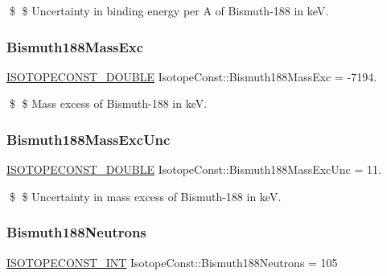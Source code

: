 \$ \$ Uncertainty in binding energy per A of Bismuth-\/188 in keV. \mbox{\label{group___isotope_const-_bismuth-_bi188_ga1f9b59eec0aa8df4194155f8e20e243f}} 
\subsubsection{\texorpdfstring{Bismuth188\+Mass\+Exc}{Bismuth188MassExc}}
{\footnotesize\ttfamily \mbox{\hyperlink{group___isotope_const-_macros_ga8f45a7272ce02c0b4c65c44636ed719a}{I\+S\+O\+T\+O\+P\+E\+C\+O\+N\+S\+T\+\_\+\+D\+O\+U\+B\+LE}} Isotope\+Const\+::\+Bismuth188\+Mass\+Exc = -\/7194.}

\$ \$ Mass excess of Bismuth-\/188 in keV. \mbox{\label{group___isotope_const-_bismuth-_bi188_ga9abcb3d229080be5d2673c29e9899f69}} 
\subsubsection{\texorpdfstring{Bismuth188\+Mass\+Exc\+Unc}{Bismuth188MassExcUnc}}
{\footnotesize\ttfamily \mbox{\hyperlink{group___isotope_const-_macros_ga8f45a7272ce02c0b4c65c44636ed719a}{I\+S\+O\+T\+O\+P\+E\+C\+O\+N\+S\+T\+\_\+\+D\+O\+U\+B\+LE}} Isotope\+Const\+::\+Bismuth188\+Mass\+Exc\+Unc = 11.}

\$ \$ Uncertainty in mass excess of Bismuth-\/188 in keV. \mbox{\label{group___isotope_const-_bismuth-_bi188_ga1ad9cbc56dfd7d1bb400d93d90b9ceab}} 
\subsubsection{\texorpdfstring{Bismuth188\+Neutrons}{Bismuth188Neutrons}}
{\footnotesize\ttfamily \mbox{\hyperlink{group___isotope_const-_macros_ga5f18360b3e99483a35c32d789e62621c}{I\+S\+O\+T\+O\+P\+E\+C\+O\+N\+S\+T\+\_\+\+I\+NT}} Isotope\+Const\+::\+Bismuth188\+Neutrons = 105}

